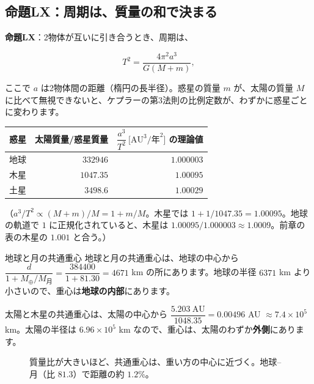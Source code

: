 \documentclass[a4paper,11pt,openany]{ltjsbook}
\begin{document}
\subsection{命題LX：周期は、質量の和で決まる}

\textbf{命題LX}：2物体が互いに引き合うとき、周期は、

\[
T^2=\frac{4\pi^2a^3}{G(M+m)},
\]

ここで $a$ は2物体間の距離（楕円の長半径）。惑星の質量 $m$ が、太陽の質量 $M$ に比べて無視できないと、ケプラーの第3法則の比例定数が、わずかに惑星ごとに変わります。

\begin{center}
\begin{tabular}{lrr}
\toprule
惑星 & 太陽質量/惑星質量 & $\dfrac{a^3}{T^2}\ \bigl[\mathrm{AU^3/年^2}\bigr]$ の理論値\\
\midrule
地球 & $332946$ & $1.000003$\\
木星 & $1047.35$ & $1.00095$\\
土星 & $3498.6$ & $1.00029$\\
\bottomrule
\end{tabular}
\end{center}

（$a^3/T^2\propto(M+m)/M=1+m/M$。木星では $1+1/1047.35=1.00095$。地球の軌道で $1$ に正規化されていると、木星は $1.00095/1.000003\approx1.0009$。前章の表の木星の $1.001$ と合う。）

\begin{examplebox}{地球と月の共通重心}
地球と月の共通重心は、地球の中心から $\dfrac{d}{1+M_\oplus/M_\text{月}}=\dfrac{384400}{1+81.30}=4671$ km の所にあります。地球の半径 $6371$ km より小さいので、重心は\textbf{地球の内部}にあります。

太陽と木星の共通重心は、太陽の中心から $\dfrac{5.203\ \text{AU}}{1048.35}=0.00496$ AU $\approx7.4\times10^5$ km。太陽の半径は $6.96\times10^5$ km なので、重心は、太陽のわずか\textbf{外側}にあります。
\end{examplebox}

\begin{figure}[htbp]
\centering
{}
\caption{質量比が大きいほど、共通重心は、重い方の中心に近づく。地球–月（比 $81.3$）で距離の約 $1.2\%$。}
\end{figure}
\end{document}
